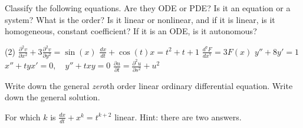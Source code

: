 \begin{exercise}
Classify the following equations.  Are they ODE or PDE\@?  Is it an equation
or a system?  What is the order?  Is it linear or nonlinear, and if it is
linear, is it homogeneous, constant coefficient?  If it is an ODE\@, is it
autonomous?
\begin{tasks}(2)
\task $\displaystyle \frac{\partial^2 v}{\partial x^2} + 3 \frac{\partial^2
v}{\partial y^2} = \sin(x)$
\task $\displaystyle \frac{d x}{dt} + \cos(t) x = t^2+t+1$
\task $\displaystyle \frac{d^7 F}{dx^7} = 3F(x)$
\task $\displaystyle y''+8y'=1$
\task $\displaystyle x''+tyx'=0, \quad y''+txy = 0$
\task $\displaystyle \frac{\partial u}{\partial t} = \frac{\partial^2 u}{\partial s^2} + u^2$
\end{tasks}
\end{exercise}

\begin{exercise}
Write down the general \emph{zero}th order linear ordinary differential
equation.  Write down the general solution.
\end{exercise}

\begin{exercise}
For which $k$ is $\frac{dx}{dt}+x^k = t^{k+2}$ linear.  Hint: there are two answers.
\end{exercise}

